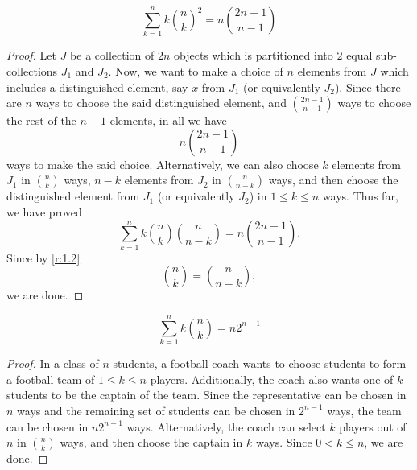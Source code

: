\begin{claim}
\[
\sum_{k=1}^{n}k\binom{n}{k}^2 = n\binom{2n-1}{n-1}
\]
\end{claim}
\begin{proof}
Let $J$ be a collection of $2n$ objects which is partitioned into $2$ equal sub-collections $J_1$ and $J_2$. Now, we want to make a choice of $n$ elements from $J$ which includes a distinguished element, say $x$ from $J_1$ (or equivalently $J_2$). Since there are $n$ ways to choose the said distinguished element, and $\binom{2n-1}{n-1}$ ways to choose the rest of the $n-1$ elements, in all we have \[
n\binom{2n-1}{n-1}
\] ways to make the said choice. Alternatively, we can also choose $k$ elements from $J_1$ in $\binom{n}{k}$ ways, $n-k$ elements from $J_2$ in $\binom{n}{n-k}$ ways, and then choose the distinguished element from $J_1$ (or equivalently $J_2$) in $1\leq k\leq n$ ways. Thus far, we have proved
\[
\sum_{k=1}^{n}k\binom{n}{k}\binom{n}{n-k} = n\binom{2n-1}{n-1}.
\]
Since by \cref{r:1.2} \[
\binom{n}{k} = \binom{n}{n-k},
\]
we are done. 
\end{proof}
\begin{claim}
\[
\sum_{k=1}^{n}k\binom{n}{k} = n2^{n-1}
\]
\end{claim}
\begin{proof}
In a class of $n$ students, a football coach wants to choose students to form a football team of $1\leq k\leq n$ players. Additionally, the coach also wants one of $k$ students to be the captain of the team. Since the representative can be chosen in $n$ ways and the remaining set of students can be chosen in $2^{n-1}$ ways, the team can be chosen in $n2^{n-1}$ ways.  Alternatively, the coach can select $k$ players out of $n$ in $\binom{n}{k}$ ways, and then choose the captain in $k$ ways. Since $0<k\leq n$, we are done. 
\end{proof}

